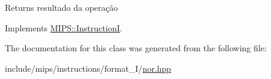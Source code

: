 \begin{DoxyReturn}{Returns}
resultado da operação 
\end{DoxyReturn}


Implements \hyperlink{classMIPS_1_1InstructionI_ae60fca5801bf5415cdff06d2aa11764f}{M\+I\+P\+S\+::\+InstructionI}.



The documentation for this class was generated from the following file\+:\begin{DoxyCompactItemize}
\item 
include/mips/instructions/format\+\_\+\+I/\hyperlink{nor_8hpp}{nor.\+hpp}\end{DoxyCompactItemize}
